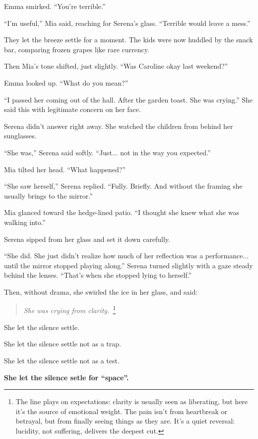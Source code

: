 Emma smirked. ``You’re terrible.''

``I’m useful,'' Mia said, reaching for Serena’s glass. ``Terrible would leave a mess.''

They let the breeze settle for a moment. The kids were now huddled by the snack bar, comparing frozen grapes 
like rare currency.

Then Mia’s tone shifted, just slightly. ``Was Caroline okay last weekend?''

Emma looked up. ``What do you mean?''

``I passed her coming out of the hall. After the garden toast. She was crying.'' She said this with legitimate 
concern on her face.

Serena didn’t answer right away. She watched the children from behind her sunglasses.

``She was,'' Serena said softly. ``Just... not in the way you expected.''

Mia tilted her head. ``What happened?''

``She saw herself,'' Serena replied. ``Fully. Briefly. And without the framing she usually brings to 
the mirror.''

Mia glanced toward the hedge-lined patio. ``I thought she knew what she was walking into.''

Serena sipped from her glass and set it down carefully.

``She did. She just didn’t realize how much of her reflection was a performance... until the mirror 
stopped playing along.'' Serena turned slightly with a gaze steady behind the lenses. ``That’s when 
she stopped lying to herself.''

Then, without drama, she swirled the ice in her glass, and said:

\begin{quote}
\centering
\textit{She was crying from clarity.}\ 
\footnote{The line plays on
expectations: clarity is usually seen as liberating, but here it’s the source of emotional weight. The pain
isn't from heartbreak or betrayal, but from finally seeing things as they are. It's a quiet reversal: lucidity,
not suffering, delivers the deepest cut.}
\end{quote}

She let the silence settle. 

She let the silence settle not as a trap.  

She let the silence settle not as a test. 

\textbf{She let the silence setle for ``space''.} 

